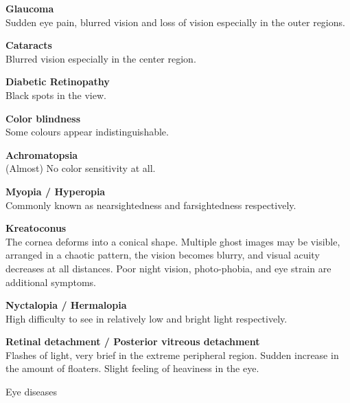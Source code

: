 \documentclass{acm_proc_article-sp}
\begin{document}
\begin{table}
    \textbf{Glaucoma}\\
    Sudden eye pain, blurred vision and loss of vision especially in the
    outer regions.

    \vspace{1em}\textbf{Cataracts}\\
    Blurred vision especially in the center region.

    \vspace{1em}\textbf{Diabetic Retinopathy}\\
    Black spots in the view.

    \vspace{1em}\textbf{Color blindness}\\
    Some colours appear indistinguishable.

    \vspace{1em}\textbf{Achromatopsia}\\
    (Almost) No color sensitivity at all.

    \vspace{1em}\textbf{Myopia / Hyperopia}\\
    Commonly known as nearsightedness and farsightedness respectively.

    \vspace{1em}\textbf{Kreatoconus}\\
    The cornea deforms into a conical shape.
    Multiple ghost images may be visible, arranged in a chaotic pattern,
    the vision becomes blurry, and visual acuity decreases at all distances.
    Poor night vision, photo-phobia, and eye strain are additional symptoms.

    \vspace{1em}\textbf{Nyctalopia / Hermalopia}\\
    High difficulty to see in relatively low and bright light respectively.

    \vspace{1em}\textbf{Retinal detachment / Posterior vitreous detachment}\\
    Flashes of light, very brief in the extreme peripheral region.
    Sudden increase in the amount of floaters.
    Slight feeling of heaviness in the eye.
    \caption{Eye diseases}
    \label{tab:eye_diseases}
\end{table}

\newpage
\end{document}
